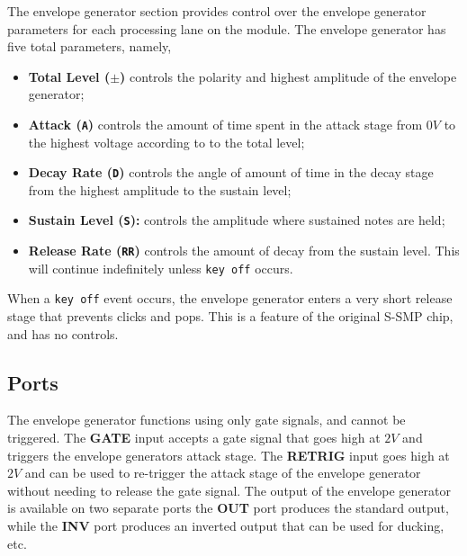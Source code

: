 \documentclass[12pt,letter]{article}
\begin{document}
The envelope generator section provides control over the envelope generator parameters for each processing lane on the module.
The envelope generator has five total parameters, namely,
\begin{itemize}
 \item \textbf{Total Level ($\pm$)} controls the polarity and highest amplitude of the envelope generator;
 \item \textbf{Attack (\texttt{A})} controls the amount of time spent in the attack stage from $0V$ to the highest voltage according to to the total level;
 \item \textbf{Decay Rate (\texttt{D})} controls the angle of amount of time in the decay stage from the highest amplitude to the sustain level;
 \item \textbf{Sustain Level (\texttt{S}):} controls the amplitude where sustained notes are held;
 \item \textbf{Release Rate (\texttt{RR})} controls the amount of decay from the sustain level. This will continue indefinitely unless \texttt{key off} occurs.
\end{itemize}

When a \texttt{key off} event occurs, the envelope generator enters a very short release stage that prevents clicks and pops. This is a feature of the original S-SMP chip, and has no controls.

\subsection{Ports}

The envelope generator functions using only gate signals, and cannot be triggered. The \textbf{GATE} input accepts a gate signal that goes high at $2V$ and triggers the envelope generators attack stage. The \textbf{RETRIG} input goes high at $2V$ and can be used to re-trigger the attack stage of the envelope generator without needing to release the gate signal. The output of the envelope generator is available on two separate ports the \textbf{OUT} port produces the standard output, while the \textbf{INV} port produces an inverted output that can be used for ducking, etc.
\end{document}
